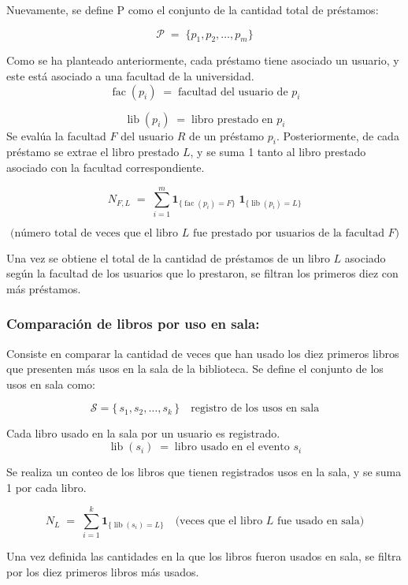 \documentclass[spanish]{ieee_upb}
\begin{document}
Nuevamente, se define P como el conjunto de la cantidad total de préstamos:

\[
  \mathcal{P}\;=\;\{
      p_1,p_2,\dots,p_m
  \}
\]

Como se ha planteado anteriormente, cada préstamo tiene asociado un usuario, y este está asociado a una facultad de la universidad. 
\[
  \operatorname{fac}(p_i)          \;=\; \text{facultad del usuario de }p_i
\]

\[
  \operatorname{lib}(p_i)          \;=\; \text{libro prestado en }p_i
\]
Se evalúa la facultad \(F\) del usuario \(R\) de un préstamo \(p_i\). Posteriormente, de cada préstamo se extrae el libro prestado \(L\), y se suma 1 tanto al libro prestado asociado con la facultad correspondiente. 

\[
  N_{F,L}\;=\;
  \sum_{i=1}^{m}
    \mathbf 1_{\{\operatorname{fac}(p_i)=F\}}
    \;\mathbf 1_{\{\operatorname{lib}(p_i)=L\}}
\]

\[
  \text{(número total de veces que el libro }L\text{ fue prestado por usuarios de la facultad }F)
\]

Una vez se obtiene el total de la cantidad de préstamos de un libro \(L\) asociado según la facultad de los usuarios que lo prestaron, se filtran los primeros diez con más préstamos. 

\subsubsection{Comparación de libros por uso en sala: }
Consiste en comparar la cantidad de veces que han usado  los diez primeros libros que presenten más usos en la sala de la biblioteca. Se define el conjunto de los usos en sala como:


\[
  \mathcal{S}= \{\,s_1,s_2,\dots,s_k\,\}
  \quad\text{registro de los usos en sala}
\]

Cada libro usado en la sala por un usuario es registrado.
\[
  \operatorname{lib}(s_i)
  \;=\;
  \text{libro usado en el evento }s_i
\]

Se realiza un conteo de los libros que tienen registrados usos en la sala, y se suma 1 por cada libro.

\[
  N_{L}
  \;=\;
  \sum_{i=1}^{k}
    \mathbf 1_{\{\operatorname{lib}(s_i)=L\}}
  \quad
  \bigl(\text{veces que el libro }L\text{ fue usado en sala}\bigr)
\]

Una vez definida las cantidades en la que los libros fueron usados en sala, se filtra por los diez primeros libros más usados.
\end{document}
